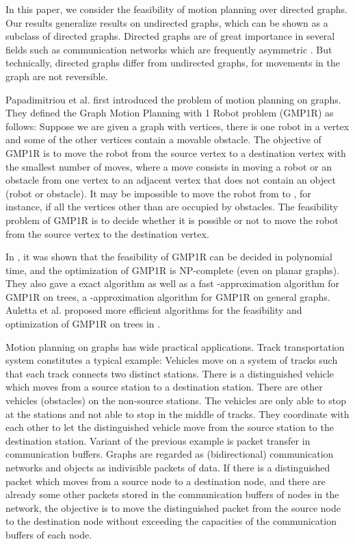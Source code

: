 \documentclass{article}
\begin{document}
In this paper, we consider the feasibility of motion planning over
directed graphs. Our results generalize results on undirected
graphs, which can be shown as a subclass of directed graphs.
Directed graphs are of great importance in several fields such as
communication networks which are frequently asymmetric
\cite{JetchevaJ06}. But technically, directed graphs differ from
undirected graphs, for movements in the graph are not reversible.

Papadimitriou et al. \cite{PapadimitriouRST94} first introduced the
problem of motion planning on graphs. They defined the Graph Motion
Planning with 1 Robot problem (GMP1R) as follows: Suppose we are
given a graph  with  vertices, there is one robot in a
vertex  and some of the other vertices contain a movable
obstacle. The objective of GMP1R is to move the robot from the
source vertex  to a destination vertex  with the smallest
number of moves, where a move consists in moving a robot or an
obstacle from one vertex to an adjacent vertex that does not contain
an object (robot or obstacle). It may be impossible to move the
robot from  to , for instance, if all the vertices other than
 are occupied by obstacles. The feasibility problem of GMP1R is
to decide whether it is possible or not to move the robot from the
source vertex to the destination vertex.

In \cite{PapadimitriouRST94}, it was shown that the feasibility of
GMP1R can be decided in polynomial time, and the optimization of
GMP1R is NP-complete (even on planar graphs). They also gave a
 exact algorithm as well as a fast -approximation
algorithm for GMP1R on trees, a -approximation
algorithm for GMP1R on general graphs. Auletta et al. proposed more
efficient algorithms for the feasibility and optimization of GMP1R
on trees in \cite{AulettaMPP96,AulettaP01}.


Motion planning on graphs has wide practical applications. Track
transportation system \cite{Per88} constitutes a typical example:
Vehicles move on a system of tracks such that each track connects
two distinct stations. There is a distinguished vehicle which moves
from a source station to a destination station. There are other
vehicles (obstacles) on the non-source stations. The vehicles are
only able to stop at the stations and not able to stop in the middle
of tracks. They coordinate with each other to let the distinguished
vehicle move from the source station to the destination station.
Variant of the previous example is packet transfer in communication
buffers. Graphs are regarded as (bidirectional) communication
networks and objects as indivisible packets of data. If there is a
distinguished packet which moves from a source node to a destination
node, and there are already some other packets stored in the
communication buffers of nodes in the network, the objective is to
move the distinguished packet from the source node to the
destination node without exceeding the capacities of the
communication buffers of each node.
\end{document}
